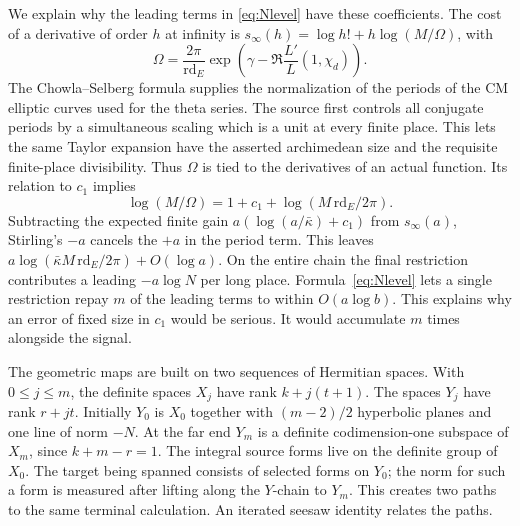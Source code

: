 We explain why the leading terms in \eqref{eq:Nlevel} have these coefficients. The cost of a derivative of order \(h\) at infinity is
\(s_\infty(h)=\log h!+h\log(M/\Omega)\), with
\[
 \Omega=\frac{2\pi}{\mathrm{rd}_E}
   \exp\!\left(\gamma-\Re\frac{L'}{L}(1,\chi_d)\right).
\]
The Chowla--Selberg formula supplies the normalization of the periods of the CM elliptic curves used for the theta series. The source first controls all conjugate periods by a simultaneous scaling which is a unit at every finite place. This lets the same Taylor expansion have the asserted archimedean size and the requisite finite-place divisibility. Thus \(\Omega\) is tied to the derivatives of an actual function. Its relation to \(c_1\) implies
\[
  \log(M/\Omega)=1+c_1+\log(M\,\mathrm{rd}_E/2\pi).
\]
Subtracting the expected finite gain \(a(\log(a/\bar\kappa)+c_1)\) from \(s_\infty(a)\), Stirling's \( -a\) cancels the \(+a\) in the period term. This leaves \(a\log(\bar\kappa M\,\mathrm{rd}_E/2\pi)+O(\log a)\). On the entire chain the final restriction contributes a leading \(-a\log N\) per long place. Formula~\eqref{eq:Nlevel} lets a single restriction repay \(m\) of the leading terms to within \(O(a\log b)\). This explains why an error of fixed size in \(c_1\) would be serious. It would accumulate \(m\) times alongside the signal.

The geometric maps are built on two sequences of Hermitian spaces. With \(0\le j\le m\), the definite spaces \(X_j\) have rank \(k+j(t+1)\). The spaces \(Y_j\) have rank \(r+jt\). Initially \(Y_0\) is \(X_0\) together with \((m-2)/2\) hyperbolic planes and one line of norm \(-N\). At the far end \(Y_m\) is a definite codimension-one subspace of \(X_m\), since \(k+m-r=1\). The integral source forms live on the definite group of \(X_0\). The target being spanned consists of selected forms on \(Y_0\); the norm for such a form is measured after lifting along the \(Y\)-chain to \(Y_m\). This creates two paths to the same terminal calculation. An iterated seesaw identity relates the paths.

